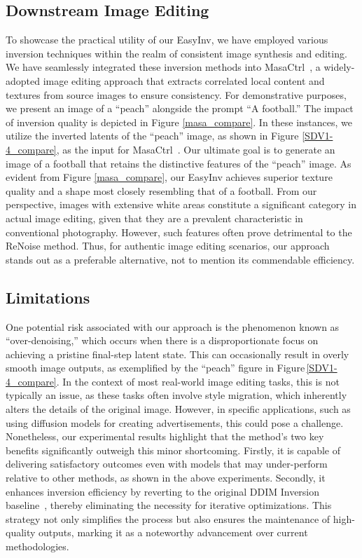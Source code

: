 \documentclass[letterpaper]{article} %
\begin{document}
\subsection{Downstream Image Editing}
%
To showcase the practical utility of our EasyInv, we have employed various inversion techniques within the realm of consistent image synthesis and editing. We have seamlessly integrated these inversion methods into MasaCtrl~\cite{cao_2023_masactrl}, a widely-adopted image editing approach that extracts correlated local content and textures from source images to ensure consistency. For demonstrative purposes, we present an image of a ``peach'' alongside the prompt ``A football.'' The impact of inversion quality is depicted in Figure \ref{masa_compare}. In these instances, we utilize the inverted latents of the ``peach'' image, as shown in Figure \ref{SDV1-4_compare}, as the input for MasaCtrl~\cite{cao_2023_masactrl}. Our ultimate goal is to generate an image of a football that retains the distinctive features of the ``peach'' image. As evident from Figure \ref{masa_compare}, our EasyInv achieves superior texture quality and a shape most closely resembling that of a football. From our perspective, images with extensive white areas constitute a significant category in actual image editing, given that they are a prevalent characteristic in conventional photography. However, such features often prove detrimental to the ReNoise method. Thus, for authentic image editing scenarios, our approach stands out as a preferable alternative, not to mention its commendable efficiency.




\subsection{Limitations}
\label{sec:weakness}

One potential risk associated with our approach is the phenomenon known as ``over-denoising,'' which occurs when there is a disproportionate focus on achieving a pristine final-step latent state. This can occasionally result in overly smooth image outputs, as exemplified by the ``peach'' figure in Figure\,\ref{SDV1-4_compare}.
%
In the context of most real-world image editing tasks, this is not typically an issue, as these tasks often involve style migration, which inherently alters the details of the original image. However, in specific applications, such as using diffusion models for creating advertisements, this could pose a challenge.
%
Nonetheless, our experimental results highlight that the method's two key benefits significantly outweigh this minor shortcoming. Firstly, it is capable of delivering satisfactory outcomes even with models that may under-perform relative to other methods, as shown in the above experiments. Secondly, it enhances inversion efficiency by reverting to the original DDIM Inversion baseline~\cite{couairon2023diffedit}, thereby eliminating the necessity for iterative optimizations. This strategy not only simplifies the process but also ensures the maintenance of high-quality outputs, marking it as a noteworthy advancement over current methodologies. 
\end{document}
